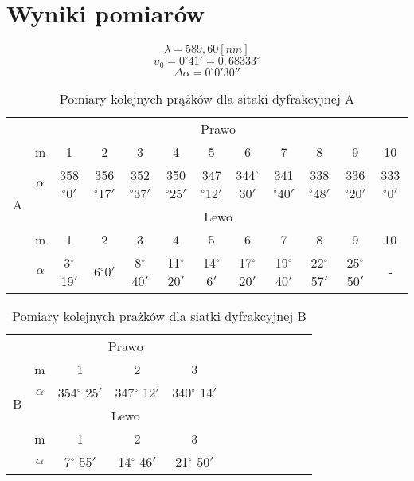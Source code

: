 \documentclass{article}
\begin{document}
\section*{Wyniki pomiarów}

\begin{center}
\[\lambda =589,60[nm]\]
\[ \upsilon_0 = 0^\circ 41' = 0,68333^\circ\] 
\[\Delta \alpha = 0^\circ 0' 30'' \]
\end{center}

\begin{table}[!ht]
    \centering
    \begin{tabular}{|c|c|c|c|c|c|c|c|c|c|c|c|}
    \hline
        \multirow{6}{*}{A}
        & \multicolumn{11}{|c|}{Prawo} \\ \cline{2-12}
        & m &1 & 2 & 3 & 4 & 5 & 6 & 7 & 8 & 9 & 10 \\ \cline{2-12}
         & $\alpha$  &358$^\circ$0$'$  & 356$^\circ$17$'$ & 352$^\circ$37$'$  & 350$^\circ$25$'$& 347$^\circ$12$'$ & 344$^\circ$ 30$'$ & 341$^\circ$40$'$ & 338$^\circ$48$'$ & 336$^\circ$20$'$& 333$^\circ$0$'$\\ \cline{2-12}
        &\multicolumn{11}{|c|}{Lewo} \\ \cline{2-12}
        & m& 1 & 2 & 3 & 4 & 5 & 6 & 7 & 8 & 9 & 10 \\ \cline{2-12}
         & $\alpha$ & 3$^\circ$19$'$ & 6$^\circ$0$'$ & 8$^\circ$40$'$ & 11$^\circ$20$'$ & 14$^\circ$6$'$ & 17$^\circ$20$'$ & 19$^\circ$40$'$ & 22$^\circ$57$'$ & 25$^\circ$50$'$ & - \\ \hline
    \end{tabular}
    \caption{Pomiary kolejnych prążków dla sitaki dyfrakcyjnej A}
\end{table}

\begin{table}[!ht]
    \centering
    \begin{tabular}{|c|c|c|c|c|c|c|c|c|c|c|c|}
    \hline
        \multirow{6}{*}{B}
        & \multicolumn{4}{|c|}{Prawo} \\ \cline{2-5}
        & m& 1 & 2 & 3 \\ \cline{2-5}
        & $\alpha$ & 354$^\circ$ 25$'$ & 347$^\circ$ 12$'$ & 340$^\circ$ 14$'$ \\ \cline{2-5}
        & \multicolumn{4}{|c|}{Lewo} \\ \cline{2-5}
        & m& 1 & 2 & 3 \\ \cline{2-5}
        & $\alpha$ & 7$^\circ$ 55$'$ & 14$^\circ$ 46$'$ & 21$^\circ$ 50$'$ \\ \hline
    \end{tabular}
    \caption{Pomiary kolejnych prażków dla siatki dyfrakcyjnej B}
\end{table}
\end{document}
